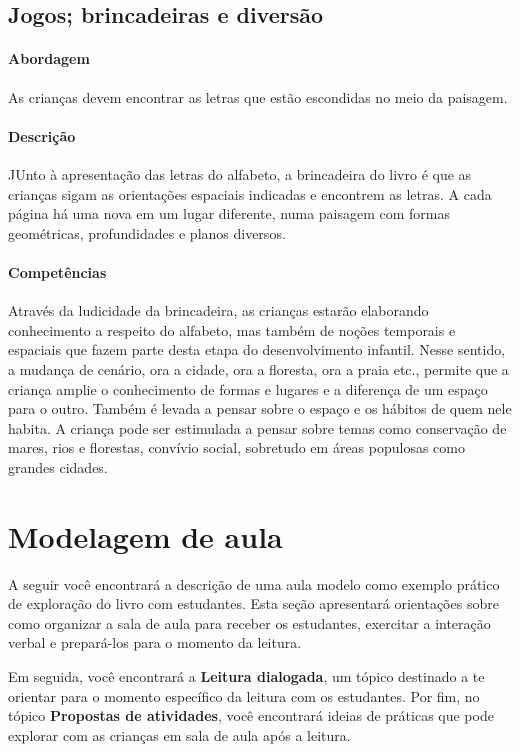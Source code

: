 \documentclass[11pt]{extarticle}
\begin{document}
\subsection{Jogos; brincadeiras e diversão}

\paragraph{Abordagem} 
As crianças devem encontrar as letras que estão escondidas
no meio da paisagem.
\paragraph{Descrição} 
JUnto à apresentação das letras do alfabeto, a brincadeira do livro
é que as crianças sigam as orientações espaciais indicadas e encontrem
as letras. A cada página há uma nova em um lugar diferente, numa
paisagem com formas geométricas, profundidades e planos diversos.
\paragraph{Competências} 
Através da ludicidade da brincadeira, as crianças estarão elaborando conhecimento a respeito do alfabeto, mas também de noções temporais e espaciais que fazem parte desta etapa do desenvolvimento infantil. Nesse sentido, a mudança de cenário, ora a cidade, ora a floresta, ora a praia etc., permite que a criança amplie o conhecimento de formas e lugares e a diferença de um espaço para o outro. Também é levada a pensar sobre o espaço e os hábitos de quem nele habita. A criança pode ser estimulada a pensar sobre temas como conservação de mares, rios e florestas, convívio social, sobretudo em áreas populosas como grandes cidades.

\section{Modelagem de aula}
A seguir você encontrará a descrição de uma aula modelo como exemplo 
prático de exploração do livro com estudantes. Esta seção apresentará 
orientações sobre como organizar a sala de aula para receber os 
estudantes, exercitar a interação verbal e prepará-los para o 
momento da leitura.

Em seguida, você encontrará a \textbf{Leitura dialogada}, um 
tópico destinado a te orientar para o momento específico da 
leitura com os estudantes. Por fim, no tópico 
\textbf{Propostas de atividades}, você encontrará ideias 
de práticas que pode explorar com as crianças em sala de 
aula após a leitura. 
\end{document}

